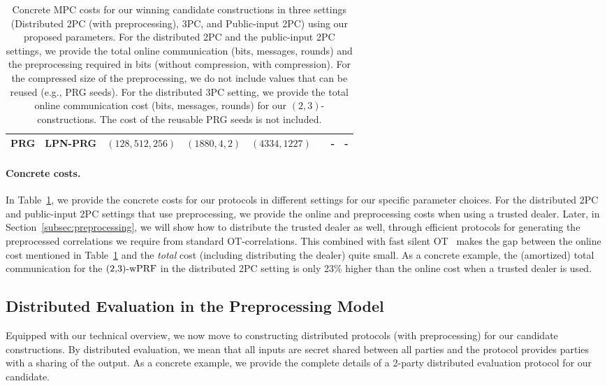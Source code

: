 \begin{table}[t]
{{\begin{tabular}{|c|c|c|c|c|c|c|c|}
  PRG & LPN-PRG & $(128,512,256)$ & $(1880, 4, 2)$ & $(4334, 1227)$ & & - & -  \\
  \hline
  \end{tabular}
}
\caption{Concrete MPC costs for our winning candidate constructions in three settings (Distributed 2PC (with preprocessing), 3PC, and Public-input 2PC) using our proposed parameters. For the distributed 2PC and the public-input 2PC settings, we provide the total online communication (bits, messages, rounds) and the preprocessing required in bits (without compression, with compression). For the compressed size of the preprocessing, we do not include values that can be reused (e.g., PRG seeds). For the distributed 3PC setting, we provide the total online communication cost (bits, messages, rounds) for our $(2,3)$-constructions. The cost of the reusable PRG seeds is not included. }
\label{table:construction_costs}
}
\end{table}


\paragraph{Concrete costs.}
In Table~\ref{table:construction_costs}, we provide the concrete costs for our protocols in different settings for our specific parameter choices. For the distributed 2PC and public-input 2PC settings that use preprocessing, we provide the online and preprocessing costs when using a trusted dealer. Later, in Section~\ref{subsec:preprocessing}, we will show how to distribute the trusted dealer as well, through efficient protocols for generating the preprocessed correlations we require from standard OT-correlations. This combined with fast silent OT~\cite{boyle2019-pcg,yang2020-ferret} makes the gap between the online cost mentioned in Table~\ref{table:construction_costs} and the \textit{total} cost (including distributing the dealer) quite small. As a concrete example, the (amortized) total communication for the $\ttwPRF$ in the distributed 2PC setting is only 23\% higher than the online cost when a trusted dealer is used.

\iffull
\subsection{Distributed Evaluation in the Preprocessing Model}
\label{subsec:distributed_protocol}
Equipped with our technical overview, we now move to constructing distributed protocols (with preprocessing) for our candidate constructions. By distributed evaluation, we mean that all inputs are secret shared between all parties and the protocol provides parties with a sharing of the output. As a concrete example, we provide the complete details of a 2-party distributed evaluation protocol for our \ttwPRF candidate.
\else
